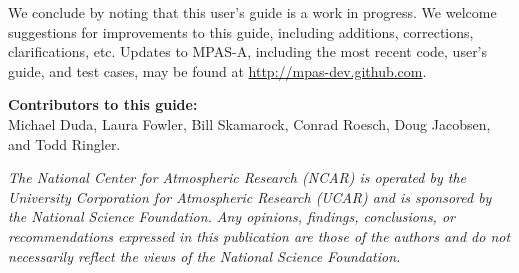 We conclude by noting that this user's guide is a work in progress.  We welcome suggestions for improvements to this guide, including additions, corrections, clarifications, etc.  Updates to MPAS-A, including the most recent code,
user's guide, and test cases, may be found at \hfil\break \url{http://mpas-dev.github.com}.

\vspace{8pt}
\noindent
{\bf Contributors to this guide:}\\
Michael Duda, Laura Fowler, Bill Skamarock, Conrad Roesch, 
Doug Jacobsen, and Todd Ringler.


\vfil
\noindent
{\it The National Center for Atmospheric Research (NCAR) is operated by the
University Corporation for Atmospheric Research (UCAR) and is sponsored by the
National Science Foundation.  Any opinions, findings, conclusions, or
recommendations expressed in this publication are those of the authors and do
not necessarily reflect the views of the National Science Foundation.}
